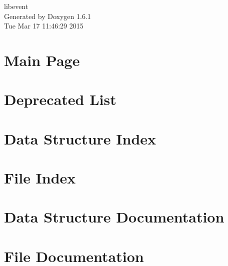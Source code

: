 \documentclass[a4paper]{book}
\begin{document}
\begin{titlepage}
\vspace*{7cm}
\begin{center}
{\Large libevent }\\
\vspace*{1cm}
{\large Generated by Doxygen 1.6.1}\\
\vspace*{0.5cm}
{\small Tue Mar 17 11:46:29 2015}\\
\end{center}
\end{titlepage}
\clearemptydoublepage
{}
\tableofcontents
\clearemptydoublepage
{}
\chapter{Main Page}
\label{index}
\chapter{Deprecated List}
\label{deprecated}

\chapter{Data Structure Index}

\chapter{File Index}

\chapter{Data Structure Documentation}











\chapter{File Documentation}
















\printindex
\end{document}
